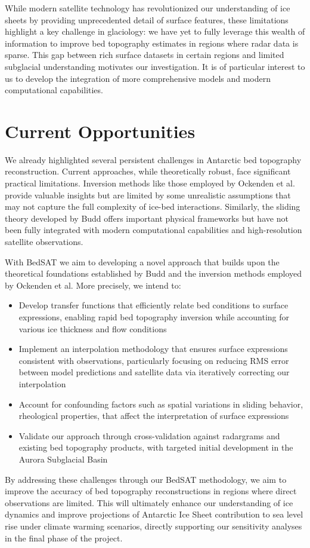 While modern satellite technology has revolutionized our understanding of ice sheets by providing unprecedented detail of surface features, these limitations highlight a key challenge in glaciology: we have yet to fully leverage this wealth of information to improve bed topography estimates in regions where radar data is sparse. This gap between rich surface datasets in certain regions and limited subglacial understanding motivates our investigation. It is of particular interest to us to develop the integration of more comprehensive models and modern computational capabilities.


\section{Current Opportunities}

We already highlighted several persistent challenges in Antarctic bed topography reconstruction. Current approaches, while theoretically robust, face significant practical limitations. Inversion methods like those employed by Ockenden et al. provide valuable insights but are limited by some unrealistic assumptions that may not capture the full complexity of ice-bed interactions. Similarly, the sliding theory developed by Budd offers important physical frameworks but have not been fully integrated with modern computational capabilities and high-resolution satellite observations.

With BedSAT we aim to developing a novel approach that builds upon the theoretical foundations established by Budd and the inversion methods employed by Ockenden et al.
More precisely, we intend to:

\begin{itemize}
    \item Develop transfer functions that efficiently relate bed conditions to surface expressions, enabling rapid bed topography inversion while accounting for various ice thickness and flow conditions
    
    \item Implement an interpolation methodology that ensures surface expressions consistent with observations, particularly focusing on reducing RMS error between model predictions and satellite data via iteratively correcting our interpolation
    
    \item Account for confounding factors such as spatial variations in sliding behavior, rheological properties, that affect the interpretation of surface expressions
    
    \item Validate our approach through cross-validation against radargrams and existing bed topography products, with targeted initial development in the Aurora Subglacial Basin
\end{itemize}

By addressing these challenges through our BedSAT methodology, we aim to improve the accuracy of bed topography reconstructions in regions where direct observations are limited. This will ultimately enhance our understanding of ice dynamics and improve projections of Antarctic Ice Sheet contribution to sea level rise under climate warming scenarios, directly supporting our sensitivity analyses in the final phase of the project.